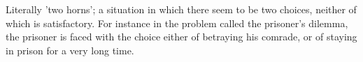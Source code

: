 Literally 'two horns'; a situation in which there seem to
be two choices, neither of which is satisfactory. For instance
in the problem called the prisoner's dilemma, the prisoner is
faced with the choice either of betraying his comrade, or of 
staying in prison for a very long time.